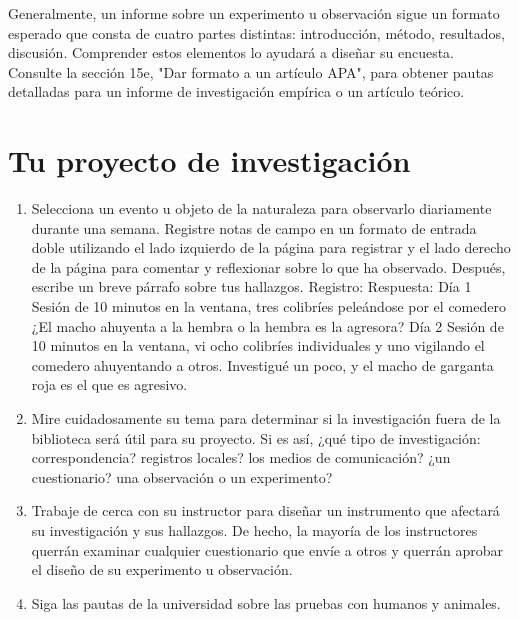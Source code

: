 Generalmente, un informe sobre un experimento u observación sigue un formato esperado que consta de cuatro partes distintas: introducción, método, resultados, discusión. Comprender estos elementos lo ayudará a diseñar su encuesta. Consulte la sección 15e, "Dar formato a un artículo APA", para obtener pautas detalladas para un informe de investigación empírica o un artículo teórico.\\

\section{Tu proyecto de investigación}
\begin{enumerate}[1.]
    \item Selecciona un evento u objeto de la naturaleza para observarlo diariamente durante una semana. Registre notas de campo en un formato de entrada doble utilizando el lado izquierdo de la página para registrar y el lado derecho de la página para comentar y reflexionar sobre lo que ha observado. Después, escribe un breve párrafo sobre tus hallazgos. Registro: Respuesta: Día 1 Sesión de 10 minutos en la ventana, tres colibríes peleándose por el comedero ¿El macho ahuyenta a la hembra o la hembra es la agresora? Día 2 Sesión de 10 minutos en la ventana, vi ocho colibríes individuales y uno vigilando el comedero ahuyentando a otros. Investigué un poco, y el macho de garganta roja es el que es agresivo.
    \item Mire cuidadosamente su tema para determinar si la investigación fuera de la biblioteca será útil para su proyecto. Si es así, ¿qué tipo de investigación: correspondencia? registros locales? los medios de comunicación? ¿un cuestionario? una observación o un experimento? 
    \item Trabaje de cerca con su instructor para diseñar un instrumento que afectará su investigación y sus hallazgos. De hecho, la mayoría de los instructores querrán examinar cualquier cuestionario que envíe a otros y querrán aprobar el diseño de su experimento u observación. 
    \item Siga las pautas de la universidad sobre las pruebas con humanos y animales.
\end{enumerate}



